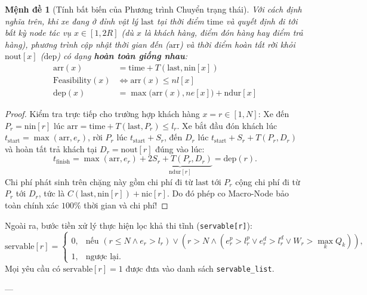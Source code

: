 \documentclass[11pt,a4paper]{article}
\newtheorem{proposition}[theorem]{Mệnh đề}
\theoremstyle{definition}
\begin{document}
\begin{proposition}[Tính bất biến của Phương trình Chuyển trạng thái]
Với cách định nghĩa trên, khi xe đang ở đỉnh vật lý $\text{last}$ tại thời điểm $\text{time}$ và quyết định đi tới bất kỳ node tác vụ $x \in [1, 2R]$ (dù $x$ là khách hàng, điểm đón hàng hay điểm trả hàng), phương trình cập nhật thời gian đến ($\text{arr}$) và thời điểm hoàn tất rời khỏi $\text{nout}[x]$ ($\text{dep}$) có dạng \textbf{hoàn toàn giống nhau}:
\begin{align}
    \text{arr}(x) &= \text{time} + T(\text{last}, \text{nin}[x]) \label{eq:arr}\\
    \text{Feasibility}(x) &\iff \text{arr}(x) \le nl[x] \label{eq:feas}\\
    \text{dep}(x) &= \max\big(\text{arr}(x), ne[x]\big) + \text{ndur}[x] \label{eq:dep}
\end{align}
\end{proposition}
\begin{proof}
Kiểm tra trực tiếp cho trường hợp khách hàng $x = r \in [1, N]$:
Xe đến $P_r = \text{nin}[r]$ lúc $\text{arr} = \text{time} + T(\text{last}, P_r) \le l_r$. Xe bắt đầu đón khách lúc $t_{\text{start}} = \max(\text{arr}, e_r)$, rời $P_r$ lúc $t_{\text{start}} + S_r$, đến $D_r$ lúc $t_{\text{start}} + S_r + T(P_r, D_r)$ và hoàn tất trả khách tại $D_r = \text{nout}[r]$ đúng vào lúc:
\[
    t_{\text{finish}} = \max(\text{arr}, e_r) + \underbrace{2S_r + T(P_r, D_r)}_{\text{ndur}[r]} = \text{dep}(r).
\]
Chi phí phát sinh trên chặng này gồm chi phí đi từ $\text{last}$ tới $P_r$ cộng chi phí đi từ $P_r$ tới $D_r$, tức là $C(\text{last}, \text{nin}[r]) + \text{nic}[r]$. Do đó phép co Macro-Node bảo toàn chính xác $100\%$ thời gian và chi phí!
\end{proof}

Ngoài ra, bước tiền xử lý thực hiện lọc khả thi tĩnh (\texttt{servable[r]}):
\[
    \text{servable}[r] = \begin{cases}
    0, & \text{nếu } (r \le N \land e_r > l_r) \lor (r > N \land (e^p_r > l^p_r \lor e^d_r > l^d_r \lor W_r > \max_{k} Q_k)),\\
    1, & \text{ngược lại.}
    \end{cases}
\]
Mọi yêu cầu có $\text{servable}[r] = 1$ được đưa vào danh sách \texttt{servable\_list}.

---

\end{document}
